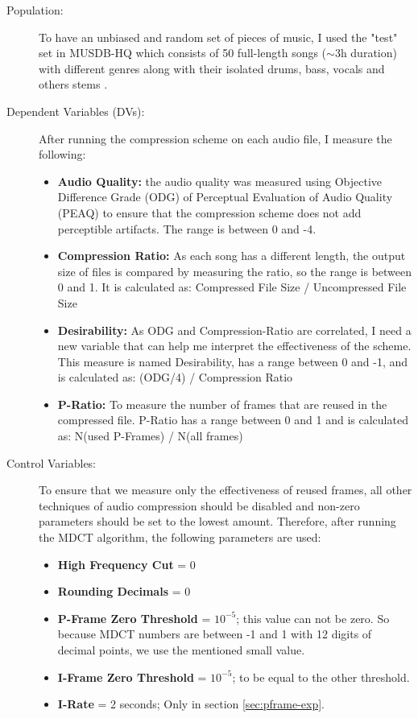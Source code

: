 \begin{description}
\item[Population:] To have an unbiased and random set of pieces of music, I used the "test" set in MUSDB-HQ which consists of 50 full-length songs ($\sim$3h duration) with different genres along with their isolated drums, bass, vocals and others stems \cite{musdb18-hq}.

\item[Dependent Variables (DVs):] After running the compression scheme on each audio file, I measure the following:
\begin{itemize}
\item\textbf{Audio Quality:} the audio quality was measured using Objective Difference Grade (ODG) of Perceptual Evaluation of Audio Quality (PEAQ) \cite{peaq} to ensure that the compression scheme does not add perceptible artifacts. The range is between 0 and -4.
\item\textbf{Compression Ratio:} As each song has a different length, the output size of files is compared by measuring the ratio, so the range is between 0 and 1. It is calculated as:  Compressed File Size / Uncompressed File Size
\item\textbf{Desirability:} As ODG and Compression-Ratio are correlated, I need a new variable that can help me interpret the effectiveness of the scheme. This measure is named Desirability, has a range between 0 and -1, and is calculated as: (ODG/4) / Compression Ratio
\item\textbf{P-Ratio:} To measure the number of frames that are reused in the compressed file. P-Ratio has a range between 0 and 1 and is calculated as: N(used P-Frames) / N(all frames)
\end{itemize}

\item[Control Variables:] To ensure that we measure only the effectiveness of reused frames, all other techniques of audio compression should be disabled and non-zero parameters should be set to the lowest amount. Therefore, after running the MDCT algorithm, the following parameters are used:
\begin{itemize}
\item\textbf{High Frequency Cut} = 0
\item\textbf{Rounding Decimals} = 0
\item\textbf{P-Frame Zero Threshold} = ${10}^{-5}$; this value can not be zero. So because MDCT numbers are between -1 and 1 with 12 digits of decimal points, we use the mentioned small value.
\item\textbf{I-Frame Zero Threshold} = ${10}^{-5}$; to be equal to the other threshold.
\item\textbf{I-Rate} = 2 seconds; Only in section \ref{sec:pframe-exp}.
\end{itemize}


\end{description}

